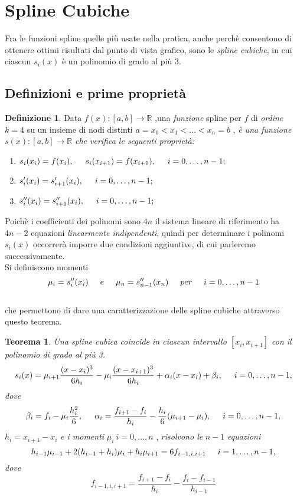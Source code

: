 \documentclass[a4paper,12pt]{report}
\newcommand\tab[1][0.5cm]{\hspace*{#1}}
\theoremstyle{definition}
\newtheorem{defin}{Definizione}[chapter]
\newtheorem{thrm}{Teorema}[chapter]
\begin{document}
\section{Spline Cubiche}
Fra le funzioni spline quelle più usate nella pratica, anche perchè consentono di ottenere ottimi risultati dal punto di vista grafico, sono le \textit{spline cubiche}, in cui ciascun $s_i(x)$ è un polinomio di grado al più 3.
\subsection{Definizioni e prime proprietà}
\begin{defin}\label{def_spline}
	Data $f(x) : [a,b] \to \mathbb{R}$ ,una \textit{funzione} spline  per $f$ di \textit{ordine $k = 4$} su un insieme di nodi distinti $a = x_0 < x_1 < \ldots < x_n =  b$ , \textit{è una funzione} $s(x) : [a,b] \to \mathbb{R}$ \textit{che verifica le seguenti proprietà:} \\
	\begin{enumerate}
		\item $ s_i(x_i) = f(x_i) , \tab s_i(x_{i+1}) = f(x_{i+1}),\tab i = 0,\ldots,n-1;$
		\item$ s_i^\prime(x_i) = s_{i+1}^\prime(x_i) ,\tab i = 0,\ldots,n-1;$
		\item $ s_i^{\prime\prime}(x_i) = s_{i+1}^{\prime\prime}(x_i) ,\tab i = 0,\ldots,n-1;$
	\end{enumerate}

\end{defin}
Poichè i coefficienti dei polinomi sono $4n$ il sistema lineare di riferimento ha $4n -2$ equazioni \textit{linearmente indipendenti}, quindi per determinare i polinomi $s_i(x)$ occorrerà imporre due condizioni aggiuntive, di cui parleremo successivamente.\\
Si definiscono momenti \\
$$\mu_i = s_i^{\prime\prime}(x_i)\tab e \tab \mu_n =
s_{n-1}^{\prime\prime}(x_n) \tab per \tab i = 0 , \ldots , n-1$$ \\
che permettono di dare una caratterizzazione delle spline cubiche attraverso questo teorema.
\begin{thrm} \label{th_spline}
	\textit{Una spline cubica coincide in ciascun intervallo $[x_i,x_{i+1}]$ con il polinomio di grado al più 3.}
	$$s_i(x) = \mu_{i+1}\frac{(x-x_i)^3}{6h_i} - \mu_i \frac{(x - x_{i+1})^3}{6h_i} + \alpha_i(x-x_i) + \beta_i , \tab i = 0 ,\ldots , n-1,$$
	\textit{dove}
	$$\beta_i = f_i - \mu_i \frac{h_i^2}{6} , \tab \alpha_i = \frac{f_{i+1} - f_i}{h_i} - \frac{h_i}{6} (\mu_{i+1} - \mu_i) , \tab i  = 0 , \ldots , n-1,$$
	$h_i = x_{i+1} - x_i$ \textit{e i momenti} $\mu_i \ i = 0 , \ldots , n$ , \textit{risolvono le} $n-1$ \textit{equazioni}
	$$h_{i-1} \mu_{i-1} + 2(h_{i-1} + h_i) \mu_i + h_i \mu_{i+1} = 6 f_{i-1,i,i+1} \tab i = 1 , \ldots , n-1 ,$$
	\textit{dove}
	$$f_{i-1,i,i+1} = \frac{f_{i+1} - f_i}{h_i} - \frac{f_i - f_{i-1}}{h_{i-1}}$$
\end{thrm}
\end{document}
